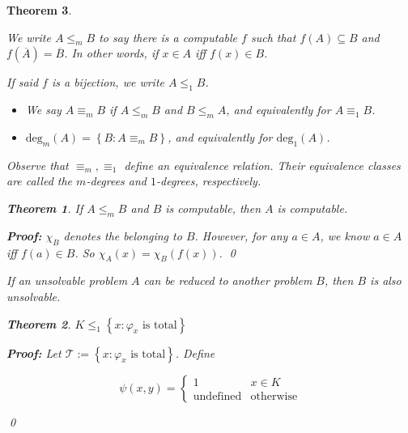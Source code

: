 \documentclass[a4paper, 12pt]{article}
\newtheorem{theorem}{Theorem}
\newtheorem{theorem}{Theorem}
\newenvironment{proof}[1][Proof]{\par\small\noindent\textbf{#1:} }{\qed\par\normalsize}
\begin{document}
\begin{theorem}
\begin{definition}
    We write $A \leq_m B$ to say there is a computable $f$ such that 
    $f(A) \subseteq B$ and $f(\overline{A}) = \overline{B}$.
    In other words, if $x \in A$ iff $f(x) \in B$.
\end{definition}

If said $f$ is a bijection, we write $A \leq_1 B$.

\begin{definition}
    \begin{itemize}
        \item We say $A \equiv_m B$ if $A \leq_m B$ and $B \leq_m A$,
            and equivalently for $A \equiv_1 B$.
        \item $\text{deg}_m(A) = \left\{ B : A \equiv_m B \right\} $,
            and equivalently for $\text{deg}_1(A)$.
    \end{itemize}
\end{definition}

Observe that $\equiv_m, \equiv_1$ define an equivalence relation.
Their equivalence classes are called the $m$-degrees
and $1$-degrees, respectively.

\begin{theorem}
    If $A \leq_m B$ and $B$ is computable, then $A$
    is computable.
\end{theorem}

\begin{proof}
    $\chi_B$ denotes the belonging to $B$. However, for any $a \in A$,
    we know $a \in A$ iff $f(a) \in B$. So $\chi_A(x) = \chi_B\left( f(x) \right) $.
\end{proof}

If an unsolvable problem $A$ can be reduced to another problem 
$B$, then $B$ is also unsolvable. 

\begin{theorem}
    $K \leq_1 \left\{ x : \varphi_x \text{ is total} \right\} $
\end{theorem}

\begin{proof}
    Let $\mathcal{T} := \left\{ x : \varphi_x \text{ is total} \right\} $. Define 

    \begin{equation*}
        \psi(x, y) = \begin{cases}
            1 & x \in K \\ 
            \text{undefined} &\text{otherwise}
        \end{cases}
    \end{equation*}


\end{proof}
\end{theorem}
\end{document}
